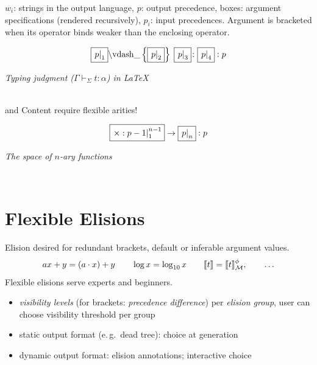 \documentclass[a0,portrait]{a0poster}
\def\ExprColor#1{#1}
\def\ElisColor#1{#1}
\def\lden{[\kern-.15em[}\def\rden{]\kern-.15em]}
\def\imarg#1#2{\fbox{\ensuremath{\left.#1\right|_{#2}}}}
\def\fimarg#1#2#3{\fbox{\ensuremath{\left.#1\right|_{#2}^{#3}}}}
\def\recu#1{#1}%
\begin{document}
\begin{multicols}{2}
$w_i$: strings in the output language, $p$: output precedence, boxes: argument
specifications (rendered recursively), $p_i$: input precedences.  Argument is bracketed when its operator binds weaker than the enclosing operator.

\begin{minipage}{.64\linewidth}
  \[\imarg{p}{1}\text{\ensuremath{\backslash}vdash\_}\left\{\imarg{p}{2}\right\}\;\imarg{p}{3}\colon\imarg{p}{4}:p\]
\end{minipage}%
\begin{minipage}{.34\linewidth}
  \centering
\textit{Typing judgment ($\Gamma\vdash_\Sigma t\colon\alpha$) in \LaTeX}
\end{minipage}\\[1ex]

{\openmath} and Content {\mathml} require \ExprColor{flexible arities}!\\

\begin{minipage}{.64\linewidth}
\[\fimarg{\times:\recu{p-1}}{1}{n-1}\to\imarg{\recu{p}}{n}:p\]
\end{minipage}%
\begin{minipage}{.34\linewidth}
  \centering
\textit{The space of $n$-ary functions}
\end{minipage}\\[1ex]


\section*{Flexible Elisions}
\label{sec:elisions}

Elision desired for redundant brackets, default or inferable argument values.
\[ax+y=(a\cdot x)+y\qquad\log x=\log_{10}x\qquad\lden t\rden=\lden t\rden_{\cal M}^\phi, \qquad\ldots\]
Flexible elisions serve experts and beginners.
\begin{itemize}
\item \ElisColor{\emph{visibility levels}} (for brackets: \emph{precedence
    difference}) per \ElisColor{\emph{elision group}}, user can choose
  visibility threshold per group
\item static output format (e.\,g.\ dead tree): choice at generation
\item dynamic output format: elision annotations; interactive choice
\end{itemize}


\end{multicols}
\end{document}
